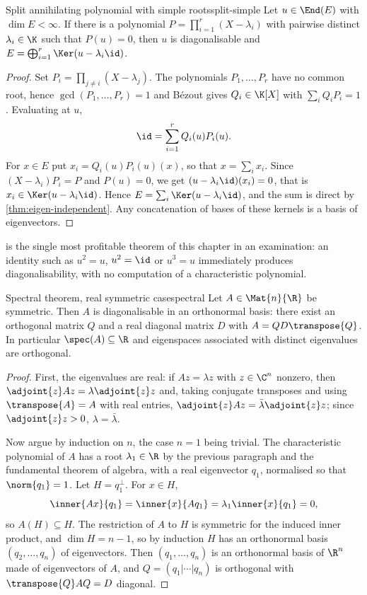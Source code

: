 \begin{theorem}{Split annihilating polynomial with simple roots}{split-simple}
Let $u\in\End(E)$ with $\dim E<\infty$. If there is a polynomial
$P=\prod_{i=1}^{r}(X-\lambda_i)$ with pairwise distinct $\lambda_i\in\K$ such
that $P(u)=0$, then $u$ is diagonalisable and
$E=\bigoplus_{i=1}^{r}\Ker(u-\lambda_i\id)$.
\end{theorem}

\begin{proof}
Set $P_i=\prod_{j\neq i}(X-\lambda_j)$. The polynomials $P_1,\dots,P_r$ have no
common root, hence $\gcd(P_1,\dots,P_r)=1$ and B\'ezout gives $Q_i\in\K[X]$ with
$\sum_i Q_iP_i=1$. Evaluating at $u$,
\[
  \id=\sum_{i=1}^{r}Q_i(u)P_i(u).
\]
For $x\in E$ put $x_i=Q_i(u)P_i(u)(x)$, so that $x=\sum_i x_i$. Since
$(X-\lambda_i)P_i=P$ and $P(u)=0$, we get $(u-\lambda_i\id)(x_i)=0$, that is
$x_i\in\Ker(u-\lambda_i\id)$. Hence $E=\sum_i\Ker(u-\lambda_i\id)$, and the sum
is direct by \cref{thm:eigen-independent}. Any concatenation of bases of these
kernels is a basis of eigenvectors.
\end{proof}

\begin{note}
 is the single most profitable theorem of this chapter in
an examination: an identity such as $u^{2}=u$, $u^{2}=\id$ or $u^{3}=u$
immediately produces diagonalisability, with no computation of a characteristic
polynomial.
\end{note}

\begin{theorem}{Spectral theorem, real symmetric case}{spectral}
Let $A\in\Mat{n}{\R}$ be symmetric. Then $A$ is diagonalisable in an orthonormal
basis: there exist an orthogonal matrix $Q$ and a real diagonal matrix $D$ with
$A=QD\transpose{Q}$. In particular $\spec(A)\subseteq\R$ and eigenspaces
associated with distinct eigenvalues are orthogonal.
\end{theorem}

\begin{proof}
First, the eigenvalues are real: if $Az=\lambda z$ with $z\in\C^{n}$ nonzero,
then $\adjoint{z}Az=\lambda\adjoint{z}z$ and, taking conjugate transposes and
using $\transpose{A}=A$ with real entries, $\adjoint{z}Az=\bar\lambda\adjoint{z}z$;
since $\adjoint{z}z>0$, $\lambda=\bar\lambda$.

Now argue by induction on $n$, the case $n=1$ being trivial. The characteristic
polynomial of $A$ has a root $\lambda_1\in\R$ by the previous paragraph and the
fundamental theorem of algebra, with a real eigenvector $q_1$, normalised so
that $\norm{q_1}=1$. Let $H=q_1^{\perp}$. For $x\in H$,
\[
  \inner{Ax}{q_1}=\inner{x}{Aq_1}=\lambda_1\inner{x}{q_1}=0,
\]
so $A(H)\subseteq H$. The restriction of $A$ to $H$ is symmetric for the induced
inner product, and $\dim H=n-1$, so by induction $H$ has an orthonormal basis
$(q_2,\dots,q_n)$ of eigenvectors. Then $(q_1,\dots,q_n)$ is an orthonormal
basis of $\R^{n}$ made of eigenvectors of $A$, and $Q=(q_1|\cdots|q_n)$ is
orthogonal with $\transpose{Q}AQ=D$ diagonal.
\end{proof}

